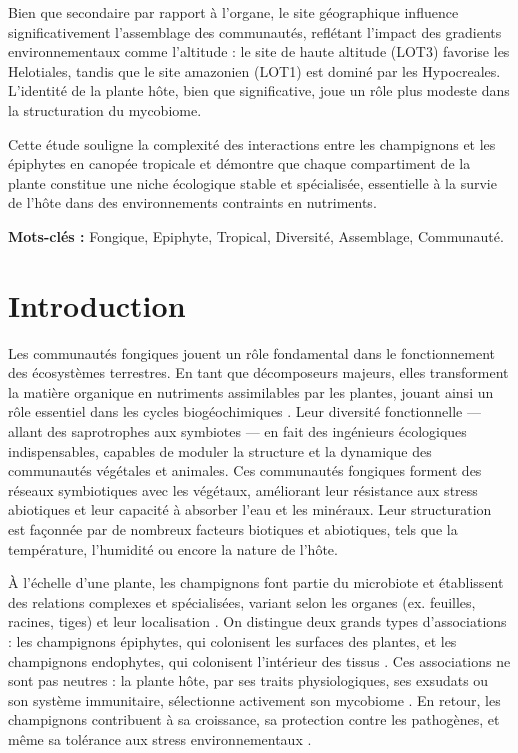 \documentclass[a4paper,12pt]{article}
\begin{document}
Bien que secondaire par rapport à l'organe, le site géographique influence significativement l'assemblage des communautés, reflétant l'impact des gradients environnementaux comme l'altitude : le site de haute altitude (LOT3) favorise les Helotiales, tandis que le site amazonien (LOT1) est dominé par les Hypocreales. L'identité de la plante hôte, bien que significative, joue un rôle plus modeste dans la structuration du mycobiome.  

Cette étude souligne la complexité des interactions entre les champignons et les épiphytes en canopée tropicale et démontre que chaque compartiment de la plante constitue une niche écologique stable et spécialisée, essentielle à la survie de l'hôte dans des environnements contraints en nutriments.  



\textbf{Mots-clés :} Fongique, Epiphyte, Tropical, Diversité, Assemblage, Communauté.





\newpage
\onehalfspacing
\section{Introduction}

Les communautés fongiques jouent un rôle fondamental dans le fonctionnement des écosystèmes terrestres. En tant que décomposeurs majeurs, elles transforment la matière organique en nutriments assimilables par les plantes, jouant ainsi un rôle essentiel dans les cycles biogéochimiques \citep{finlay2008ecological}. Leur diversité fonctionnelle — allant des saprotrophes aux symbiotes — en fait des ingénieurs écologiques indispensables, capables de moduler la structure et la dynamique des communautés végétales et animales. Ces communautés fongiques forment des réseaux symbiotiques avec les végétaux, améliorant leur résistance aux stress abiotiques et leur capacité à absorber l’eau et les minéraux. Leur structuration est façonnée par de nombreux  facteurs biotiques et abiotiques, tels que la température, l’humidité ou encore la nature de l’hôte. 

À l’échelle d’une plante, les champignons font partie du  microbiote et établissent des relations complexes et spécialisées, variant selon les organes (ex. feuilles, racines, tiges) et leur localisation \citep{vandenkoornhuyse2015importance}. On distingue deux grands types d’associations : les champignons épiphytes, qui colonisent les  surfaces des plantes, et les champignons endophytes, qui colonisent l’intérieur des tissus \citep{zotz_plants_2016}. Ces associations ne sont pas neutres : la plante hôte,  par ses traits physiologiques, ses exsudats ou son système immunitaire, sélectionne activement son  mycobiome \citep{sasse2018feed}. En retour, les champignons contribuent à sa croissance, sa protection contre les pathogènes, et même sa tolérance aux stress environnementaux \citep{rodriguez2009fungal}. 
\end{document}
